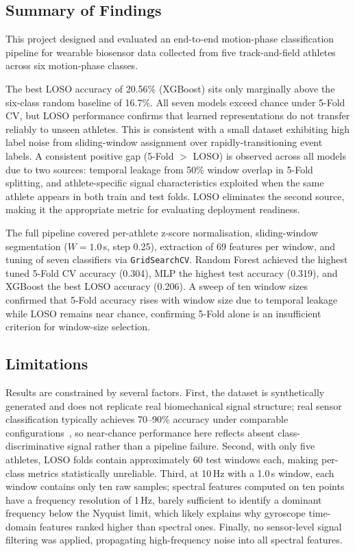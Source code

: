 \documentclass[12pt,a4paper]{cibb}
\begin{document}
\subsection{Summary of Findings}
This project designed and evaluated an end-to-end motion-phase classification pipeline for wearable biosensor data collected from five track-and-field athletes across six motion-phase classes.

The best LOSO accuracy of 20.56\% (XGBoost) sits only marginally above the six-class random baseline of 16.7\%. All seven models exceed chance under 5-Fold CV, but LOSO performance confirms that learned representations do not transfer reliably to unseen athletes. This is consistent with a small dataset exhibiting high label noise from sliding-window assignment over rapidly-transitioning event labels. A consistent positive gap (5-Fold $>$ LOSO) is observed across all models due to two sources: temporal leakage from 50\% window overlap in 5-Fold splitting, and athlete-specific signal characteristics exploited when the same athlete appears in both train and test folds. LOSO eliminates the second source, making it the appropriate metric for evaluating deployment readiness.

The full pipeline covered per-athlete z-score normalisation, sliding-window segmentation ($W=1.0$\,s, step 0.25), extraction of 69 features per window, and tuning of seven classifiers via \texttt{GridSearchCV}. Random Forest achieved the highest tuned 5-Fold CV accuracy (0.304), MLP the highest test accuracy (0.319), and XGBoost the best LOSO accuracy (0.206). A sweep of ten window sizes confirmed that 5-Fold accuracy rises with window size due to temporal leakage while LOSO remains near chance, confirming 5-Fold alone is an insufficient criterion for window-size selection.

\subsection{Limitations}
Results are constrained by several factors. First, the dataset is synthetically generated and does not replicate real biomechanical signal structure; real sensor classification typically achieves 70--90\% accuracy under comparable configurations~\cite{Vitali2020}, so near-chance performance here reflects absent class-discriminative signal rather than a pipeline failure. Second, with only five athletes, LOSO folds contain approximately 60 test windows each, making per-class metrics statistically unreliable. Third, at 10\,Hz with a 1.0\,s window, each window contains only ten raw samples; spectral features computed on ten points have a frequency resolution of 1\,Hz, barely sufficient to identify a dominant frequency below the Nyquist limit, which likely explains why gyroscope time-domain features ranked higher than spectral ones. Finally, no sensor-level signal filtering was applied, propagating high-frequency noise into all spectral features.
\end{document}
